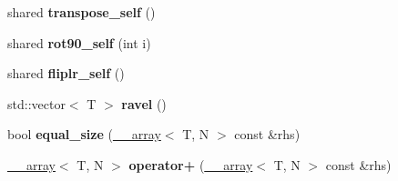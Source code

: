 \begin{DoxyCompactItemize}
\item 
\hypertarget{class____array_ac1c5c3051c03e39b9715903ee0fb202d}{
shared {\bfseries transpose\_\-self} ()}
\label{class____array_ac1c5c3051c03e39b9715903ee0fb202d}

\item 
\hypertarget{class____array_a0f127aa40d72c1087c538619e5cd6ef9}{
shared {\bfseries rot90\_\-self} (int i)}
\label{class____array_a0f127aa40d72c1087c538619e5cd6ef9}

\item 
\hypertarget{class____array_a9de6105d23a33b20a4b0cc02b923edb4}{
shared {\bfseries fliplr\_\-self} ()}
\label{class____array_a9de6105d23a33b20a4b0cc02b923edb4}

\item 
\hypertarget{class____array_a07f72930f0260b81df31b991f4c7e97d}{
std::vector$<$ T $>$ {\bfseries ravel} ()}
\label{class____array_a07f72930f0260b81df31b991f4c7e97d}

\item 
\hypertarget{class____array_accc02e65ce775d472554778825ebdeda}{
bool {\bfseries equal\_\-size} (\hyperlink{class____array}{\_\-\_\-array}$<$ T, N $>$ const \&rhs)}
\label{class____array_accc02e65ce775d472554778825ebdeda}

\item 
\hypertarget{class____array_a435566ff4cab00684e41335595b4c60c}{
\hyperlink{class____array}{\_\-\_\-array}$<$ T, N $>$ {\bfseries operator+} (\hyperlink{class____array}{\_\-\_\-array}$<$ T, N $>$ const \&rhs)}
\label{class____array_a435566ff4cab00684e41335595b4c60c}

\end{DoxyCompactItemize}
